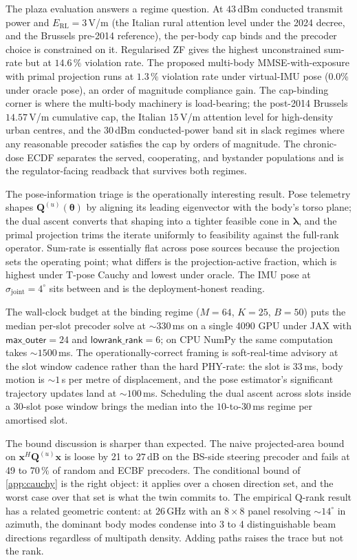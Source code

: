 \documentclass[journal,twocolumn,10pt]{IEEEtran}
\theoremstyle{plain}
\theoremstyle{remark}
\newcommand{\xx}{\mathbf{x}}
\newcommand{\Qmat}{\mathbf{Q}}
\begin{document}
The plaza evaluation answers a regime question. At $43\,$dBm
conducted transmit power and $E_{\mathrm{RL}} = 3\,$V/m (the
Italian rural attention level under the 2024 decree, and the
Brussels pre-2014 reference), the per-body cap binds and the
precoder choice is constrained on it. Regularised ZF gives the
highest unconstrained sum-rate but at $14.6\,\%$ violation rate.
The proposed multi-body MMSE-with-exposure with primal projection
runs at $1.3\,\%$ violation rate under virtual-IMU pose
(0.0\% under oracle pose), an order of magnitude compliance gain.
The cap-binding corner is where the multi-body machinery is
load-bearing; the post-2014 Brussels $14.57\,$V/m cumulative cap,
the Italian $15\,$V/m attention level for high-density urban
centres, and the $30\,$dBm conducted-power band sit in slack
regimes where any reasonable precoder satisfies the cap by orders
of magnitude. The chronic-dose ECDF separates the served,
cooperating, and bystander populations and is the regulator-facing
readback that survives both regimes.

The pose-information triage is the operationally interesting
result. Pose telemetry shapes $\Qmat^{(u)}(\bm\theta)$ by aligning
its leading eigenvector with the body's torso plane; the dual
ascent converts that shaping into a tighter feasible cone in
$\bm\lambda$, and the primal projection trims the iterate uniformly
to feasibility against the full-rank operator. Sum-rate is
essentially flat across pose sources because the projection sets
the operating point; what differs is the projection-active fraction,
which is highest under T-pose Cauchy and lowest under oracle. The
IMU pose at $\sigma_{\mathrm{joint}} = 4^\circ$ sits between and is
the deployment-honest reading.

The wall-clock budget at the binding regime ($M = 64$, $K = 25$,
$B = 50$) puts the median per-slot precoder solve at $\sim 330\,$ms
on a single 4090 GPU under JAX with $\textsf{max\_outer} = 24$ and
$\textsf{lowrank\_rank} = 6$; on CPU NumPy the same computation
takes $\sim 1500\,$ms. The operationally-correct framing is
soft-real-time advisory at the slot window cadence rather than the
hard PHY-rate: the slot is $33\,$ms, body motion is $\sim 1\,$s per
metre of displacement, and the pose estimator's significant
trajectory updates land at $\sim 100\,$ms. Scheduling the dual
ascent across slots inside a 30-slot pose window brings the median
into the $10$-to-$30\,$ms regime per amortised slot.

The bound discussion is sharper than expected. The naive
projected-area bound on $\xx^H \Qmat^{(u)} \xx$ is loose by 21 to
$27\,$dB on the BS-side steering precoder and fails at 49 to
$70\,\%$ of random and ECBF precoders. The conditional bound of
\cref{app:cauchy} is the right object: it applies over a chosen
direction set, and the worst case over that set is what the twin
commits to. The empirical Q-rank result has a related geometric
content: at $26\,$GHz with an $8\times 8$ panel resolving
$\sim 14^\circ$ in azimuth, the dominant body modes condense into
3 to 4 distinguishable beam directions regardless of multipath
density. Adding paths raises the trace but not the rank.
\end{document}
